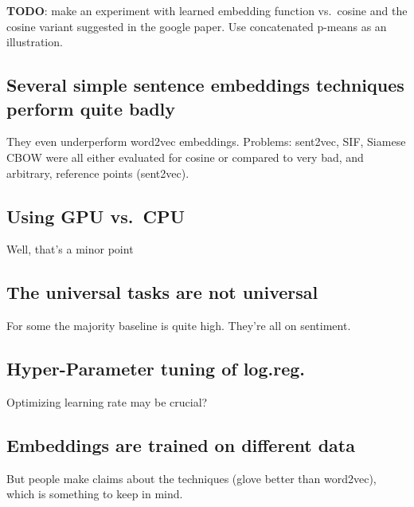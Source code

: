\textbf{TODO}: make an experiment with learned embedding function vs.\ cosine and the cosine variant suggested in the google paper. Use concatenated p-means as an illustration.

\subsection{Several simple sentence embeddings techniques perform quite badly}
They even underperform word2vec embeddings. Problems: sent2vec, SIF, Siamese CBOW were all either evaluated for cosine or compared to very bad, and arbitrary, reference points (sent2vec). 

\subsection{Using GPU vs.\ CPU}
Well, that's a minor point 

\subsection{The universal tasks are not universal}
For some the majority baseline is quite high. They're all on sentiment. 

\subsection{Hyper-Parameter tuning of log.reg.}
Optimizing learning rate may be crucial? 

\subsection{Embeddings are trained on different data}
But people make claims about the techniques (glove better than word2vec), which is something to keep in mind. 

